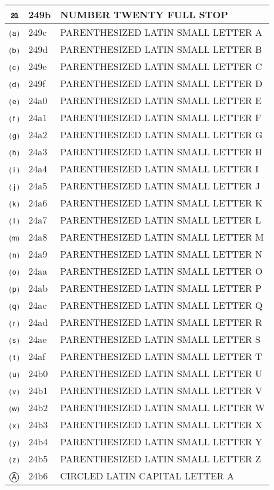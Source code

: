 \documentclass[12pt,letterpaper,openany]{book}
\begin{document}
\begin{center}
\begin{supertabular}{|m{0.25in}|m{0.5in}|m{4in}|}
⒛ & 249b & NUMBER TWENTY FULL STOP\\\hline
⒜ & 249c & PARENTHESIZED LATIN SMALL LETTER A\\\hline
⒝ & 249d & PARENTHESIZED LATIN SMALL LETTER B\\\hline
⒞ & 249e & PARENTHESIZED LATIN SMALL LETTER C\\\hline
⒟ & 249f & PARENTHESIZED LATIN SMALL LETTER D\\\hline
⒠ & 24a0 & PARENTHESIZED LATIN SMALL LETTER E\\\hline
⒡ & 24a1 & PARENTHESIZED LATIN SMALL LETTER F\\\hline
⒢ & 24a2 & PARENTHESIZED LATIN SMALL LETTER G\\\hline
⒣ & 24a3 & PARENTHESIZED LATIN SMALL LETTER H\\\hline
⒤ & 24a4 & PARENTHESIZED LATIN SMALL LETTER I\\\hline
⒥ & 24a5 & PARENTHESIZED LATIN SMALL LETTER J\\\hline
⒦ & 24a6 & PARENTHESIZED LATIN SMALL LETTER K\\\hline
⒧ & 24a7 & PARENTHESIZED LATIN SMALL LETTER L\\\hline
⒨ & 24a8 & PARENTHESIZED LATIN SMALL LETTER M\\\hline
⒩ & 24a9 & PARENTHESIZED LATIN SMALL LETTER N\\\hline
⒪ & 24aa & PARENTHESIZED LATIN SMALL LETTER O\\\hline
⒫ & 24ab & PARENTHESIZED LATIN SMALL LETTER P\\\hline
⒬ & 24ac & PARENTHESIZED LATIN SMALL LETTER Q\\\hline
⒭ & 24ad & PARENTHESIZED LATIN SMALL LETTER R\\\hline
⒮ & 24ae & PARENTHESIZED LATIN SMALL LETTER S\\\hline
⒯ & 24af & PARENTHESIZED LATIN SMALL LETTER T\\\hline
⒰ & 24b0 & PARENTHESIZED LATIN SMALL LETTER U\\\hline
⒱ & 24b1 & PARENTHESIZED LATIN SMALL LETTER V\\\hline
⒲ & 24b2 & PARENTHESIZED LATIN SMALL LETTER W\\\hline
⒳ & 24b3 & PARENTHESIZED LATIN SMALL LETTER X\\\hline
⒴ & 24b4 & PARENTHESIZED LATIN SMALL LETTER Y\\\hline
⒵ & 24b5 & PARENTHESIZED LATIN SMALL LETTER Z\\\hline
Ⓐ & 24b6 & CIRCLED LATIN CAPITAL LETTER A\\\hline

\end{supertabular}
\end{center}
\end{document}

